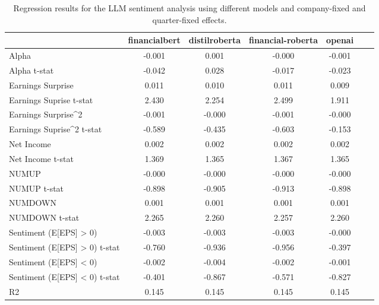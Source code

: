 \begin{table}
\caption{Regression results for the LLM sentiment analysis using different models and company-fixed and quarter-fixed effects.}
\label{tab:llm_regressions_split_cq_fixed}
\begin{tabular}{lcccccc}
\toprule
 & financialbert & distilroberta & financial-roberta & openai \\
\midrule
Alpha & -0.001 & 0.001 & -0.000 & -0.001 \\
Alpha t-stat & -0.042 & 0.028 & -0.017 & -0.023 \\
Earnings Surprise & 0.011 & 0.010 & 0.011 & 0.009 \\
Earnings Suprise t-stat & 2.430 & 2.254 & 2.499 & 1.911 \\
Earnings Surprise^2 & -0.001 & -0.000 & -0.001 & -0.000 \\
Earnings Suprise^2 t-stat & -0.589 & -0.435 & -0.603 & -0.153 \\
Net Income & 0.002 & 0.002 & 0.002 & 0.002 \\
Net Income t-stat & 1.369 & 1.365 & 1.367 & 1.365 \\
NUMUP & -0.000 & -0.000 & -0.000 & -0.000 \\
NUMUP t-stat & -0.898 & -0.905 & -0.913 & -0.898 \\
NUMDOWN & 0.001 & 0.001 & 0.001 & 0.001 \\
NUMDOWN t-stat & 2.265 & 2.260 & 2.257 & 2.260 \\
Sentiment (E[EPS] > 0) & -0.003 & -0.003 & -0.003 & -0.000 \\
Sentiment (E[EPS] > 0) t-stat & -0.760 & -0.936 & -0.956 & -0.397 \\
Sentiment (E[EPS] < 0) & -0.002 & -0.004 & -0.002 & -0.001 \\
Sentiment (E[EPS] < 0) t-stat & -0.401 & -0.867 & -0.571 & -0.827 \\
R2 & 0.145 & 0.145 & 0.145 & 0.145 \\
\bottomrule
\end{tabular}
\end{table}
